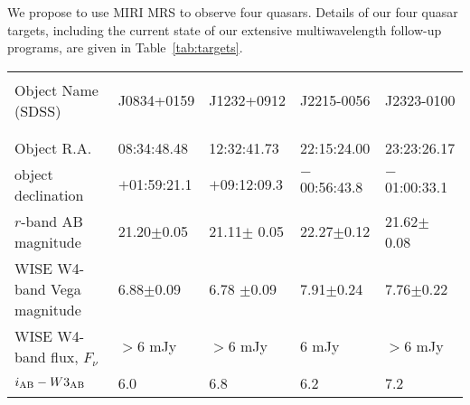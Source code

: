 
\smallskip \smallskip
\noindent
We propose to use MIRI MRS to observe four quasars. Details of our
four quasar targets, including the current state of our extensive
multiwavelength follow-up programs, are given in
Table~\ref{tab:targets}.

\begin{table}
\begin{center}
\begin{tabular}{||  l|l|l|l|l ||}
  \hline\hline
  &&&& \\
  Object Name (SDSS)        & J0834+0159         &  J1232+0912          & J2215-0056        & J2323-0100 \\
  &&&& \\
  \hline
  &&&& \\
  Object R.A.                             & 08:34:48.48         & 12:32:41.73           & 22:15:24.00          & 23:23:26.17     \\
  object declination                  & $+$01:59:21.1     & $+$09:12:09.3      & $-$00:56:43.8      & $-$01:00:33.1  \\
  $r$-band AB magnitude         & 21.20$\pm$0.05  & 21.11$\pm$ 0.05  & 22.27$\pm$0.12  & 21.62$\pm$ 0.08 \\  
  WISE W4-band Vega magnitude & 6.88$\pm$0.09  & 6.78 $\pm$0.09   & 7.91$\pm$0.24  & 7.76$\pm$0.22 \\  
  WISE W4-band flux, $F_{\nu}$   & $>$6 mJy             & $>$6 mJy              & 6 mJy                 & $>$6 mJy  \\ 
  $i_{\rm AB}-W3_{\rm AB}$            & 6.0                        & 6.8                        & 6.2                        & 7.2\\


\end{tabular}
\end{center}
\end{table}
